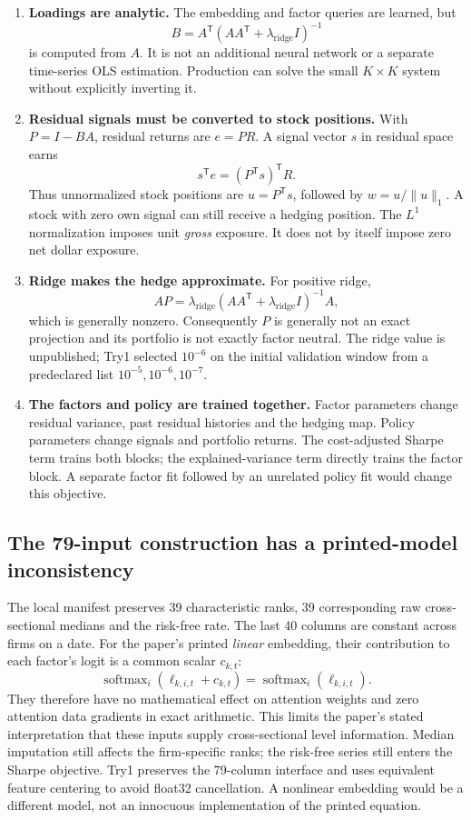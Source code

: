 \documentclass[11pt]{article}
\begin{document}
\begin{enumerate}
\item \textbf{Loadings are analytic.} The embedding and factor queries are
learned, but
\[
B=A^{\mathsf T}(AA^{\mathsf T}+\lambda_{\mathrm{ridge}}I)^{-1}
\]
is computed from $A$. It is not an additional neural network or a separate
time-series OLS estimation. Production can solve the small $K\times K$
system without explicitly inverting it.

\item \textbf{Residual signals must be converted to stock positions.}
With $P=I-BA$, residual returns are $e=PR$. A signal vector $s$ in
residual space earns
\[
s^{\mathsf T}e=(P^{\mathsf T}s)^{\mathsf T}R.
\]
Thus unnormalized stock positions are $u=P^{\mathsf T}s$, followed by
$w=u/\lVert u\rVert_1$. A stock with zero own signal can still receive a
hedging position. The $L^1$ normalization imposes unit \emph{gross}
exposure. It does not by itself impose zero net dollar exposure.

\item \textbf{Ridge makes the hedge approximate.} For positive ridge,
\[
AP=\lambda_{\mathrm{ridge}}
(AA^{\mathsf T}+\lambda_{\mathrm{ridge}}I)^{-1}A,
\]
which is generally nonzero. Consequently $P$ is generally not an exact
projection and its portfolio is not exactly factor neutral. The ridge
value is unpublished; Try1 selected $10^{-6}$ on the initial validation
window from a predeclared list $10^{-5},10^{-6},10^{-7}$.

\item \textbf{The factors and policy are trained together.} Factor
parameters change residual variance, past residual histories and the
hedging map. Policy parameters change signals and portfolio returns.
The cost-adjusted Sharpe term trains both blocks; the explained-variance
term directly trains the factor block. A separate factor fit followed by
an unrelated policy fit would change this objective.
\end{enumerate}

\subsection{The 79-input construction has a printed-model inconsistency}

The local manifest preserves 39 characteristic ranks, 39 corresponding
raw cross-sectional medians and the risk-free rate. The last 40 columns
are constant across firms on a date. For the paper's printed \emph{linear}
embedding, their contribution to each factor's logit is a common scalar
$c_{k,t}$:
\[
\operatorname{softmax}_{i}(\ell_{k,i,t}+c_{k,t})
=\operatorname{softmax}_{i}(\ell_{k,i,t}).
\]
They therefore have no mathematical effect on attention weights and zero
attention data gradients in exact arithmetic. This limits the paper's
stated interpretation that these inputs supply cross-sectional level
information. Median imputation still affects the firm-specific ranks;
the risk-free series still enters the Sharpe objective. Try1 preserves the
79-column interface and uses equivalent feature centering to avoid
float32 cancellation. A nonlinear embedding would be a different model,
not an innocuous implementation of the printed equation.
\end{document}
